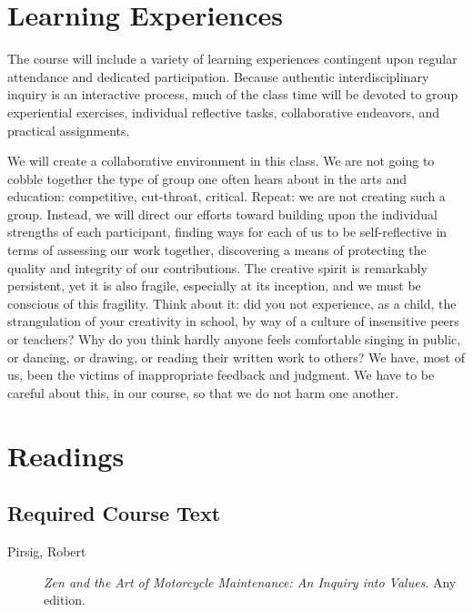 \documentclass[letterpaper,10pt,headsepline]{scrreprt}
\begin{document}
\section{Learning Experiences}
The course will include a variety of learning experiences contingent upon regular attendance and dedicated participation. Because authentic interdisciplinary inquiry is an interactive process, much of the class time will be devoted to group experiential exercises, individual reflective tasks, collaborative endeavors, and practical assignments.

We will create a collaborative environment in this class. We are not going to cobble together the type of group one often hears about in the arts and education: competitive, cut-throat, critical. Repeat: we are not creating such a group. Instead, we will direct our efforts toward building upon the individual strengths of each participant, finding ways for each of us to be self-reflective in terms of assessing our work together, discovering a means of protecting the quality and integrity of our contributions. The creative spirit is remarkably persistent, yet it is also fragile, especially at its inception, and we must be conscious of this fragility. Think about it: did you not experience, as a child, the strangulation of your creativity in school, by way of a culture of insensitive peers or teachers? Why do you think hardly anyone feels comfortable singing in public, or dancing, or drawing, or reading their written work to others? We have, most of us, been the victims of inappropriate feedback and judgment. We have to be careful about this, in our course, so that we do not harm one another.

\section{Readings}
\subsection{Required Course Text}

\begin{description}

\item [Pirsig, Robert] \textit{Zen and the Art of Motorcycle Maintenance: An Inquiry into Values}. Any edition.
\end{description}
\end{document}
